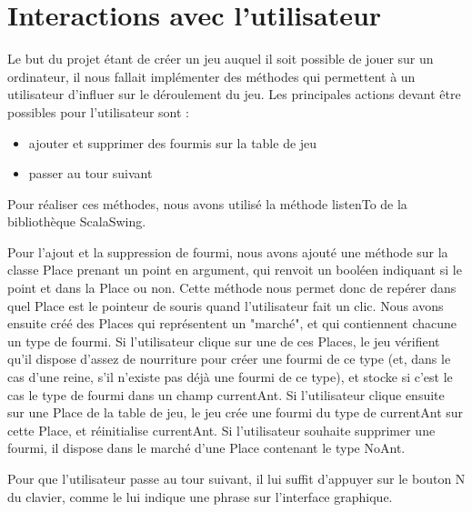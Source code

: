 \documentclass[10pt,a4paper]{article}
\begin{document}
\section{Interactions avec l'utilisateur}
Le but du projet étant de créer un jeu auquel il soit possible de jouer sur un ordinateur, il nous fallait implémenter des méthodes qui permettent à un utilisateur d'influer sur le déroulement du jeu. Les principales actions devant être possibles pour l'utilisateur sont :
\begin{itemize}
  \item ajouter et supprimer des fourmis sur la table de jeu
  \item passer au tour suivant
\end{itemize}

Pour réaliser ces méthodes, nous avons utilisé la méthode listenTo de la bibliothèque ScalaSwing.

Pour l'ajout et la suppression de fourmi, nous avons ajouté une méthode sur la classe Place prenant un point en argument, qui renvoit un booléen indiquant si le point et dans la Place ou non. Cette méthode nous permet donc de repérer dans quel Place est le pointeur de souris quand l'utilisateur fait un clic. Nous avons ensuite créé des Places qui représentent un "marché", et qui contiennent chacune un type de fourmi. Si l'utilisateur clique sur une de ces Places, le jeu vérifient qu'il dispose d'assez de nourriture pour créer une fourmi de ce type (et, dans le cas d'une reine, s'il n'existe pas déjà une fourmi de ce type), et stocke si c'est le cas le type de fourmi dans un champ currentAnt. Si l'utilisateur clique ensuite sur une Place de la table de jeu, le jeu crée une fourmi du type de currentAnt sur cette Place, et réinitialise currentAnt. Si l'utilisateur souhaite supprimer une fourmi, il dispose dans le marché d'une Place contenant le type NoAnt.

Pour que l'utilisateur passe au tour suivant, il lui suffit d'appuyer sur le bouton N du clavier, comme le lui indique une phrase sur l'interface graphique. 
\end{document}
